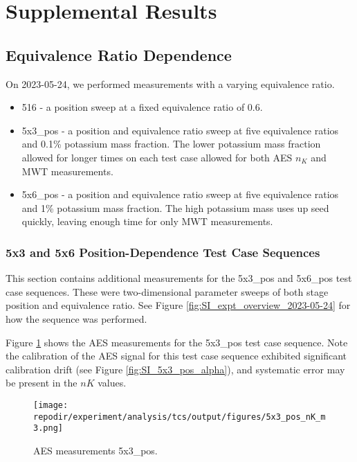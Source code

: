 \section{Supplemental Results}

\subsection{Equivalence Ratio Dependence}

On 2023-05-24, we performed measurements with a varying equivalence ratio. 

\begin{itemize}
    \item 516 - a position sweep at a fixed equivalence ratio of 0.6.
    \item 5x3\_pos - a position and equivalence ratio sweep at five equivalence ratios and 0.1\% potassium mass fraction. The lower potassium mass fraction allowed for longer times on each test case allowed for both AES $n_{K}$ and MWT measurements. 
    \item 5x6\_pos - a position and equivalence ratio sweep at five equivalence ratios and 1\% potassium mass fraction. The high potassium mass uses up seed quickly, leaving enough time for only MWT measurements. 
\end{itemize}
 
\subsubsection{5x3 and 5x6 Position-Dependence Test Case Sequences}

This section contains additional measurements for the 5x3\_pos and 5x6\_pos test case sequences. These were two-dimensional parameter sweeps of both stage position and equivalence ratio. See Figure \ref{fig:SI_expt_overview_2023-05-24} for how the sequence was performed. 

Figure \ref{fig:SI_5x3_pos_nK_m3} shows the AES measurements for the 5x3\_pos test case sequence. Note the calibration of the AES signal for this test case sequence exhibited significant calibration drift (see Figure \ref{fig:SI_5x3_pos_alpha}), and systematic error may be present in the $nK$ values. 


\begin{figure}[]
\centering
\texttt{[image: \\repodir/experiment/analysis/tcs/output/figures/5x3\_pos\_nK\_m3.png]}
\caption{AES measurements 5x3\_pos.}
\label{fig:SI_5x3_pos_nK_m3}
\end{figure}

